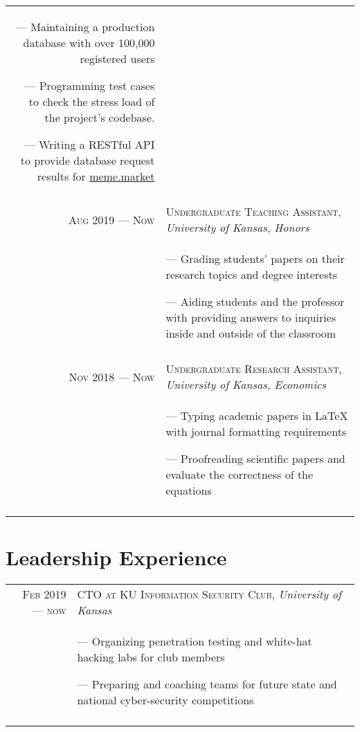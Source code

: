 \documentclass[letterpaper,10pt]{article}
\begin{document}
\begin{tabular}{r|p{11cm}}
{    --- Maintaining a production database with over 100,000 registered users
    
    --- Programming test cases to check the stress load of the project's codebase.

    --- Writing a RESTful API to provide database request results for \href{https://meme.market}{meme.market}
  } \\\multicolumn{2}{c}{}\\
  
  \textsc{Aug 2019 --- Now} &  \textsc{Undergraduate Teaching Assistant}, \emph{University of Kansas, Honors}\\&\footnotesize{
    --- Grading students' papers on their research topics and degree interests
        
    --- Aiding students and the professor with providing answers to inquiries inside and outside of the classroom
  } \\\multicolumn{2}{c}{}\\
  
  
      \textsc{Nov 2018 --- Now} &  \textsc{Undergraduate Research Assistant}, \emph{University of Kansas, Economics}\\&\footnotesize{
  --- Typing academic papers in \LaTeX{} with journal formatting requirements

  --- Proofreading scientific papers and evaluate the correctness of the equations
  } \\\multicolumn{2}{c}{}\\
  \end{tabular}

\section{Leadership Experience}
\begin{tabular}{r|p{11cm}}
  \textsc{Feb 2019 --- now} &  \textsc{CTO at KU Information Security Club}, \emph{University of Kansas}\\&\footnotesize{
    --- Organizing penetration testing and white-hat hacking labs for club members
    
    
    --- Preparing and coaching teams for future state and national cyber-security competitions
  } \\\multicolumn{2}{c}{}\\
\end{tabular}
\end{document}
